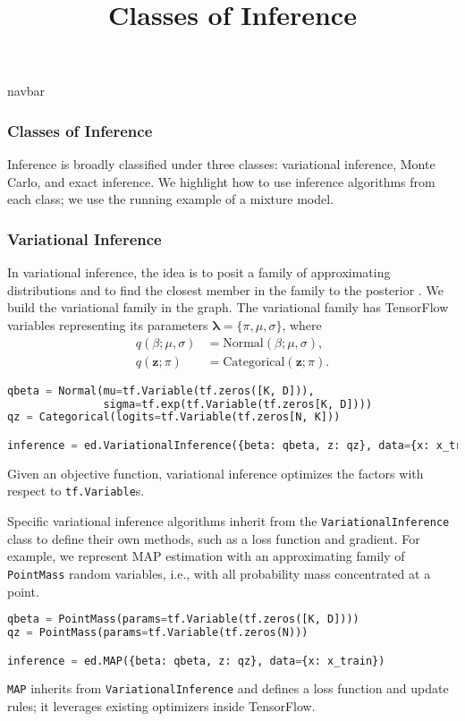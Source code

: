 \title{Classes of Inference}

{{navbar}}

\subsubsection{Classes of Inference}

Inference is broadly classified under three classes: variational
inference, Monte Carlo, and exact inference.
We highlight how to use inference algorithms from each class;
we use the running example of a mixture model.

\subsubsection{Variational Inference}

In variational inference, the idea is to posit a family of approximating
distributions and to find the closest member in the family to the
posterior \citep{jordan1999introduction}.
We build the variational family in the graph.
The variational family has TensorFlow
variables representing its parameters $\mathbf{\lambda}=\{\pi,\mu,\sigma\}$,
where
\begin{align*}
q(\beta;\mu,\sigma) &= \text{Normal}(\beta; \mu,\sigma), \\[1.5ex]
q(\mathbf{z};\pi) &= \text{Categorical}(\mathbf{z};\pi).
\end{align*}
\begin{lstlisting}[language=Python]
qbeta = Normal(mu=tf.Variable(tf.zeros([K, D])),
               sigma=tf.exp(tf.Variable(tf.zeros[K, D])))
qz = Categorical(logits=tf.Variable(tf.zeros[N, K]))

inference = ed.VariationalInference({beta: qbeta, z: qz}, data={x: x_train})
\end{lstlisting}
Given an objective function, variational inference optimizes the
factors with respect to \texttt{tf.Variable}s.

Specific variational inference algorithms inherit from
the \texttt{VariationalInference} class to define their own methods, such as a
loss function and gradient.
For example, we represent MAP estimation with
an approximating family of
\texttt{PointMass} random variables,
i.e., with all probability mass concentrated at a point.
\begin{lstlisting}[language=Python]
qbeta = PointMass(params=tf.Variable(tf.zeros([K, D])))
qz = PointMass(params=tf.Variable(tf.zeros(N)))

inference = ed.MAP({beta: qbeta, z: qz}, data={x: x_train})
\end{lstlisting}
\texttt{MAP}
inherits from \texttt{VariationalInference} and defines a loss
function and update rules; it leverages existing optimizers inside TensorFlow.

